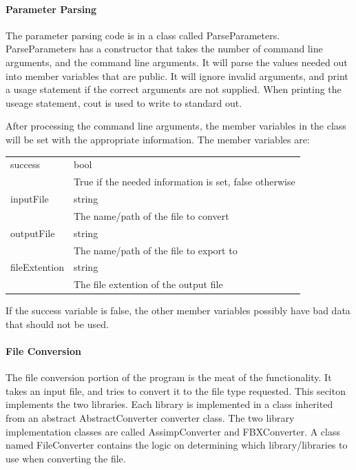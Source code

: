     \paragraph{Parameter Parsing}
    \hfill \break
    The parameter parsing code is in a class called ParseParameters.  ParseParameters has a constructor that takes the number of command line arguments, 
    and the command line arguments.  It will parse the values needed out into member variables that are public.  It will ignore invalid arguments,
    and print a usage statement if the correct arguments are not supplied.  When printing the useage statement, cout is used to write to standard out.

    After processing the command line arguments, the member variables in the class will be set with the appropriate information.  The member variables are:

    \begin{tabular}{l l}
        \centering
        success & bool \\
        & True if the needed information is set, false otherwise \\

        inputFile & string \\
        & The name/path of the file to convert \\

        outputFile & string \\
        & The name/path of the file to export to \\

        fileExtention & string \\
        & The file extention of the output file
    \end{tabular}

    If the success variable is false, the other member variables possibly have bad data that should not be used.

    \paragraph{File Conversion}
    \hfill \break
    The file conversion portion of the program is the meat of the functionality.  It takes an input file, and tries to convert it to the file type requested.
    This seciton implements the two libraries.  Each library is implemented in a class inherited from an abstract AbstractConverter converter class.  The two 
    library implementation classes are called AssimpConverter and FBXConverter.  A class named FileConverter contains the logic on determining which 
    library/libraries to use when converting the file.

